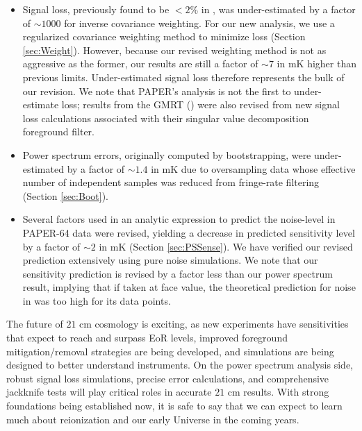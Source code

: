 \documentclass[preprint2,numberedappendix,tighten]{aastex6}  %
\begin{document}
\begin{itemize}
\item Signal loss, previously found to be $<2\%$ in , was under-estimated by a factor of $\sim$$1000$ for inverse 
covariance weighting. For our new analysis, we use a regularized covariance weighting method to minimize loss (Section 
\ref{sec:Weight}). However, because our revised weighting method is not as aggressive as the former, our results are still a 
factor of $\sim7$ in mK higher than previous limits. Under-estimated signal loss therefore represents the bulk of our revision. We 
note that PAPER's analysis is not the first to under-estimate loss; results from the GMRT (\citealt{paciga_et_al2013}) were also 
revised from new signal loss calculations associated with their singular value decomposition foreground filter.
\item Power spectrum errors, originally computed by bootstrapping, were under-estimated by a factor of $\sim$$1.4$ in mK due to oversampling data whose effective number of independent samples was reduced from fringe-rate filtering (Section \ref{sec:Boot}). 
\item Several factors used in an analytic expression to predict the noise-level in PAPER-64 data were revised, yielding a 
decrease in predicted sensitivity level by a factor of $\sim$$2$ in mK (Section \ref{sec:PSSense}). We have verified our revised 
prediction extensively using pure noise simulations. We note that our sensitivity prediction is revised by a factor less than our 
power spectrum result, implying that if taken at face value, the theoretical prediction for noise in  was too high for its data 
points.
\end{itemize}

The future of $21$ cm cosmology is exciting, as new experiments have sensitivities that expect to reach and surpass EoR levels, improved 
foreground mitigation/removal strategies are being developed, and simulations are being designed to better understand 
instruments. On the power spectrum analysis side, robust signal loss simulations, precise error calculations, and 
comprehensive jackknife tests will play critical roles in accurate $21$ cm results. With strong foundations being established now, it is safe to say that we can expect to learn much about reionization and our early Universe in the coming years.


\end{document}

